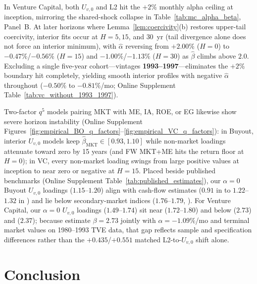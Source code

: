 \documentclass[12pt]{article}
\begin{document}
In Venture Capital, both $U_{v,0}$ and L2 hit the $+2\%$ monthly alpha ceiling at inception, mirroring the shared-shock collapse in Table~\ref{tab:mc_alpha_beta}, Panel~B.
At later horizons where Lemma~\ref{lem:coercivity}(b) restores upper-tail coercivity, interior fits occur at $H = 5, 15$, and $30$~yr (tail divergence alone does not force an interior minimum), with $\hat\alpha$ reversing from $+2.00\%$ ($H=0$) to $-0.47\%$/$-0.56\%$ ($H=15$) and $-1.00\%$/$-1.13\%$ ($H=30$) as $\hat\beta$ climbs above $2.0$.
Excluding a single five-year cohort---vintages \textbf{1993--1997}---eliminates the $+2\%$ boundary hit completely, yielding smooth interior profiles with negative $\hat\alpha$ throughout ($-0.50\%$ to $-0.81\%$/mo; Online Supplement Table~\ref{tab:vc_without_1993_1997}).

Two-factor $q^5$ models pairing MKT with ME, IA, ROE, or EG likewise show severe horizon instability (Online Supplement Figures~\ref{fig:empirical_BO_q_factors}--\ref{fig:empirical_VC_q_factors}): in Buyout, interior $U_{v,0}$ models keep $\hat\beta_{\mathrm{MKT}} \in [0.93, 1.10]$ while non-market loadings attenuate toward zero by 15 years (and FW MKT+ME hits the return floor at $H=0$); in VC, every non-market loading swings from large positive values at inception to near zero or negative at $H=15$.
Placed beside published benchmarks (Online Supplement Table~\ref{tab:published_estimates}), our $\alpha = 0$ Buyout $U_{v,0}$ loadings ($1.15$--$1.20$) align with cash-flow estimates ($0.91$ in \citealp{KN24} to $1.22$--$1.32$ in \citealp{ACGP18,DLP12,FNP12}) and lie below secondary-market indices ($1.76$--$1.79$, \citealp{boyer2023discount}).
For Venture Capital, our $\alpha = 0$ $U_{v,0}$ loadings ($1.49$--$1.74$) sit near \citet{ACGP18} ($1.72$--$1.80$) and below \citet{DLP12} ($2.73$) and \citet{KN24} ($2.37$); because \citet[Table~5, pp.~527--528]{DLP12} estimate $\beta = 2.73$ jointly with $\alpha = -1.09\%$/mo and terminal market values on 1980--1993 TVE data, that gap reflects sample and specification differences rather than the $+0.435$/$+0.551$ matched L2-to-$U_{v,0}$ shift alone.


\section{Conclusion}
\label{sec:conclusion}
\end{document}
